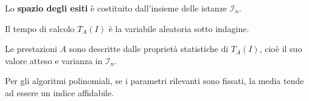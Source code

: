 \documentclass[\main/main.tex]{subfiles}
\begin{document}
\begin{multicols}{2}
\begin{definition}[Benchmark]
\end{definition}
\begin{observation}
    Lo \textbf{spazio degli esiti} è costituito dall'insieme delle istanze \(\mathcal{I}_n\).
\end{observation}
\begin{observation}
    Il tempo di calcolo \(T_A(I)\) è la variabile aleatoria sotto indagine.
\end{observation}
\begin{observation}
    Le prestazioni \(A\) sono descritte dalle proprietà statistiche di \(T_A(I)\), cioè il suo valore atteso e varianza in \(\mathcal{I}_n\).
\end{observation}
\begin{observation}
    Per gli algoritmi polinomiali, se i parametri rilevanti sono fissati, la media tende ad essere un indice affidabile.
\end{observation}
\end{multicols}
\clearpage
\end{document}

